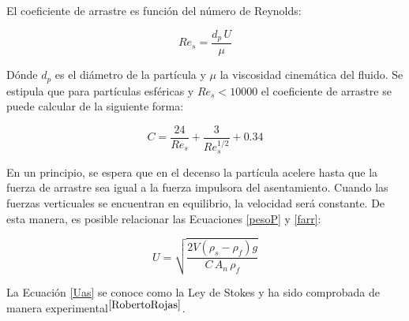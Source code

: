\noindent
\justify

El coeficiente de arrastre es funci\'on del n\'umero de Reynolds:

\begin{equation}
	Re _s = \frac{d_p \, U}{\mu}
	\label{Res}
\end{equation}

\noindent
\justify

D\'onde $d_p$ es el di\'ametro de la part\'icula y $\mu$ la viscosidad cinem\'atica del fluido. Se estipula que para part\'iculas esf\'ericas y $Re _s < 10000$ el coeficiente de arrastre se puede calcular de la siguiente forma:

\begin{equation}
	C = \frac{24}{Re_s} + \frac{3}{Re _s ^{1/2}} + 0.34
	\label{CoefArr}
\end{equation}

\noindent
\justify

En un principio, se espera que en el decenso la part\'icula acelere hasta que la fuerza de arrastre sea igual a la fuerza impulsora del asentamiento. Cuando las fuerzas verticuales se encuentran en equilibrio, la velocidad ser\'a constante. De esta manera, es posible relacionar las Ecuaciones \ref{pesoP} y \ref{farr}:

\begin{equation}
	U = \sqrt{\frac{2 V \left(\rho _s - \rho _f \right) g}{C \, A_n \, \rho _f}}
	\label{Uas}
\end{equation}

\noindent
\justify

La Ecuaci\'on \ref{Uas} se conoce como la Ley de Stokes y ha sido comprobada de manera experimental$^{\cite{RobertoRojas}}$.